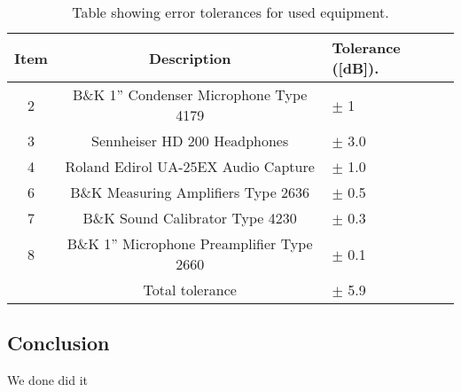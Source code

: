 \begin{table}[h]
	\centering
	\begin{tabular}{ c c l } \toprule
	{Item}	& 		{Description} 							& {Tolerance ([dB])}.\\ \bottomrule 
		2	&	B\&K 1'' Condenser Microphone Type 4179 	& $\pm$ 1		\\
		3	&	Sennheiser HD 200 Headphones				& $\pm$ 3.0		\\
		4	&	Roland Edirol UA-25EX Audio Capture			& $\pm$ 1.0		\\
		6	&	B\&K Measuring Amplifiers Type 2636			& $\pm$ 0.5		\\
		7	&	B\&K Sound Calibrator Type 4230				& $\pm$ 0.3		\\ 
		8	&	B\&K 1'' Microphone Preamplifier Type 2660	& $\pm$ 0.1		\\ \bottomrule
			&	Total tolerance								& $\pm$ 5.9		\\ \bottomrule	
	\end{tabular}
	\caption{Table showing error tolerances for used equipment.}
	\label{TolerancesHP}
\end{table}

































\subsection{Conclusion}
We done did it